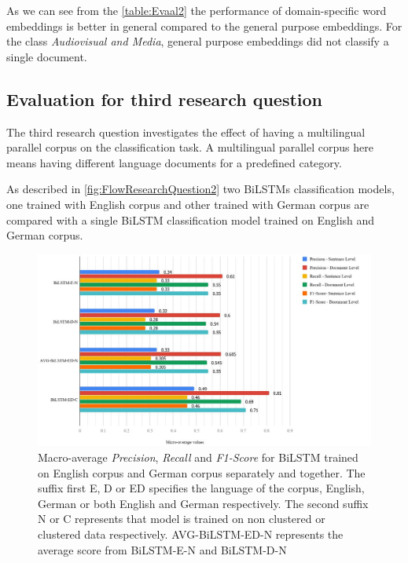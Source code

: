 As we can see from the \ref{table:Evaal2} the performance of domain-specific word embeddings is better in general compared to the general purpose embeddings. For the class \textit{Audiovisual and Media}, general purpose embeddings did not classify a single document. 
\clearpage

\subsection{Evaluation for third research question}

The third research question investigates the effect of having a multilingual parallel corpus on the classification task. A multilingual parallel corpus here means having different language documents for a predefined category. 

As described in \ref{fig:FlowResearchQuestion2} two \glspl{BiLSTM} classification models, one trained with English corpus and other trained with German corpus are compared with a single \gls{BiLSTM} classification model trained on English and German corpus.

\begin{figure}[!ht]
    \centering
    \includegraphics[width=15cm, keepaspectratio]{pics/3.jpg}
    \caption{Macro-average \textit{Precision}, \textit{Recall} and \textit{F1-Score} for \gls{BiLSTM} trained on English corpus and German corpus separately and together. The suffix first E, D or ED specifies the language of the corpus, English, German or both English and German respectively. The second suffix N or C represents that model is trained on non clustered or clustered data respectively. AVG-BiLSTM-ED-N represents the average score from BiLSTM-E-N and BiLSTM-D-N}
    \label{fig:EvaluationQuestion3}
\end{figure}

